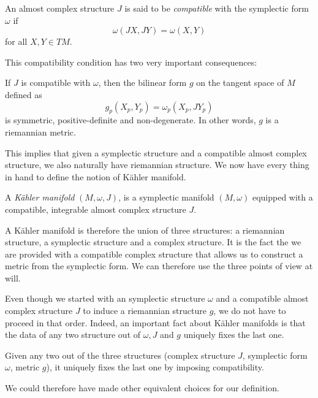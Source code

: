 \documentclass{worksheetclass}
\begin{document}
        \begin{defn}
            An almost complex structure $J$ is said to be \emph{compatible} with the symplectic form $\omega$ if 
            \begin{equation*}
                \omega(JX,JY) = \omega(X,Y)
            \end{equation*}
            for all $X,Y\in TM$.
        \end{defn}
        This compatibility condition has two very important consequences:
        \begin{prop}
            If $J$ is compatible with $\omega$, then the bilinear form $g$ on the tangent space of $M$ defined as
            \begin{equation}
                g_p(X_p,Y_p)=\omega_p(X_p,JY_p)\label{eq:kahlermetric}
            \end{equation}
            is symmetric, positive-definite and non-degenerate. In other words, $g$ is a riemannian metric.
        \end{prop}
        This implies that given a symplectic structure and a compatible almost complex structure, we also naturally have riemannian structure. We now have every thing in hand to define the notion of Kähler manifold.
        \begin{defn}
            A \emph{Kähler manifold} $(M,\omega,J)$, is a symplectic manifold $(M,\omega)$ equipped with a compatible, integrable almost complex structure $J$.
        \end{defn}
        A Kähler manifold is therefore the union of three structures: a riemannian structure, a symplectic structure and a complex structure. It is the fact the we are provided with a compatible complex structure that allows us to construct a metric from the symplectic form. We can therefore use the three points of view at will.

        Even though we started with an symplectic structure $\omega$ and a compatible almost complex structure $J$ to induce a riemannian structure $g$, we do not have to proceed in that order. Indeed, an important fact about Kähler manifolds is that the data of any two structure out of $\omega,J$ and $g$ uniquely fixes the last one.
        \begin{prop}
            Given any two out of the three structures (complex structure $J$, symplectic form $\omega$, metric $g$), it uniquely fixes the last one by imposing compatibility.
        \end{prop}
        We could therefore have made other equivalent choices for our definition.
        
\end{document}
